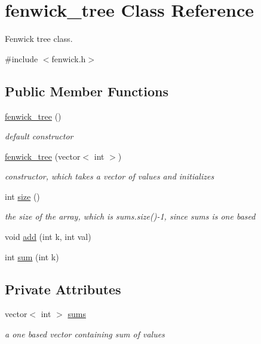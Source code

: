 \hypertarget{classfenwick__tree}{}\section{fenwick\+\_\+tree Class Reference}
\label{classfenwick__tree}


Fenwick tree class.  




{\ttfamily \#include $<$fenwick.\+h$>$}

\subsection*{Public Member Functions}
\begin{DoxyCompactItemize}
\item 
\hyperlink{classfenwick__tree_a6a23235d1eb40c9858057525d7ed6d70}{fenwick\+\_\+tree} ()
\begin{DoxyCompactList}\small\item\em default constructor \end{DoxyCompactList}\item 
\hyperlink{classfenwick__tree_a35288559f8182d96aef8ddba5cb46adb}{fenwick\+\_\+tree} (vector$<$ int $>$)
\begin{DoxyCompactList}\small\item\em constructor, which takes a vector of values and initializes \end{DoxyCompactList}\item 
int \hyperlink{classfenwick__tree_abedd21a2ddbbb830195c8eba1330112f}{size} ()
\begin{DoxyCompactList}\small\item\em the size of the array, which is sums.\+size()-\/1, since sums is one based \end{DoxyCompactList}\item 
void \hyperlink{classfenwick__tree_ab2f999bba718bcd57d066db754d85ad4}{add} (int k, int val)
\item 
int \hyperlink{classfenwick__tree_adad26fa851d811b4d1e0328a5c6eae03}{sum} (int k)
\end{DoxyCompactItemize}
\subsection*{Private Attributes}
\begin{DoxyCompactItemize}
\item 
vector$<$ int $>$ \hyperlink{classfenwick__tree_ac05c8fc17f358a38a2bab242f9164138}{sums}
\begin{DoxyCompactList}\small\item\em a one based vector containing sum of values \end{DoxyCompactList}\end{DoxyCompactItemize}


